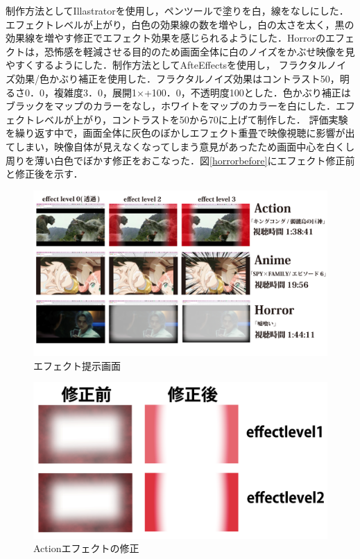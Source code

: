 制作方法としてIllastratorを使用し，ペンツールで塗りを白，線をなしにした．エフェクトレベルが上がり，白色の効果線の数を増やし，白の太さを太く，黒の効果線を増やす修正でエフェクト効果を感じられるようにした．Horrorのエフェクトは，恐怖感を軽減させる目的のため画面全体に白のノイズをかぶせ映像を見やすくするようにした．制作方法としてAfteEffectsを使用し，
フラクタルノイズ効果/色かぶり補正を使用した．フラクタルノイズ効果はコントラスト50，明るさ0．0，複雑度3．0，展開1×+100．0，不透明度100とした．色かぶり補正はブラックをマップのカラーをなし，ホワイトをマップのカラーを白にした．エフェクトレベルが上がり，コントラストを50から70に上げて制作した．
評価実験を繰り返す中で，画面全体に灰色のぼかしエフェクト重畳で映像視聴に影響が出てしまい，映像自体が見えなくなってしまう意見があったため画面中心を白くし周りを薄い白色でぼかす修正をおこなった．図\ref{horrorbefore}にエフェクト修正前と修正後を示す．
 
\begin{figure}[H]
   \centering
   \includegraphics[width=16cm]{images/chapter3/efects.jpg}
   \caption{エフェクト提示画面}
   \label{efectteiji}
\end{figure}
 
\begin{figure}[H]
   \centering
   \includegraphics[width=16cm]{images/chapter3/actionberore.jpg}
   \caption{Actionエフェクトの修正}
   \label{actionbefore}
\end{figure}
 
